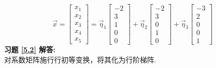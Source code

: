 \documentclass[a4paper]{book}
\begin{document}
\begin{equation*}
\vec{x}=\begin{bmatrix}x_1\\x_2\\x_3\\x_4\\x_5\end{bmatrix}=
\vec{\eta}_1\begin{bmatrix}-2\\3\\1\\0\\0\end{bmatrix}+\vec{\eta}_2\begin{bmatrix}-2\\3\\0\\1\\0\end{bmatrix}
+\vec{\eta}_3\begin{bmatrix}-3\\2\\0\\0\\1\end{bmatrix}
\end{equation*}
\textbf{习题 \ref{5.2} 解答:}\\
对系数矩阵施行行初等变换，将其化为行阶梯阵.
\end{document}
